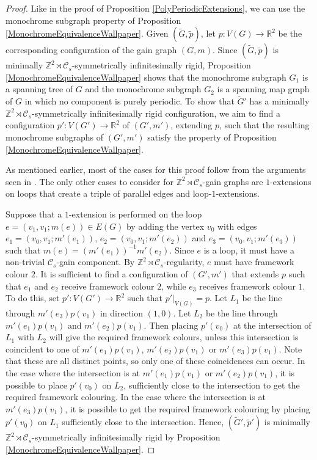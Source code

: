 \documentclass[reqno,a4paper,10pt]{article}
\theoremstyle{definition}
\theoremstyle{remark}
\numberwithin{equation}{section}
\numberwithin{figure}{section}
\numberwithin{table}{section}
\newcommand{\R}{\mathbb{R}}
\newcommand{\Z}{\mathbb{Z}}
\newcommand{\G}{\tilde{G}}
\newcommand{\p}{\tilde{p}}
\begin{document}
    \begin{proof}
        Like in the proof of Proposition \ref{PolyPeriodicExtensions}, we can use the monochrome subgraph property of Proposition \ref{MonochromeEquivalenceWallpaper}. Given $(\G,\p)$, let $p:V(G)\to\R^2$ be the corresponding configuration of the gain graph $(G,m)$. Since $(\G,\p)$ is minimally $\Z^2\rtimes\mathcal{C}_s$-symmetrically infinitesimally rigid, Proposition \ref{MonochromeEquivalenceWallpaper} shows that the monochrome subgraph $G_1$ is a spanning tree of $G$ and the monochrome subgraph $G_2$ is a spanning map graph of $G$ in which no component is purely periodic. To show that $\G'$ has a minimally $\Z^2\rtimes\mathcal{C}_s$-symmetrically infinitesimally rigid configuration, we aim to find a configuration $p':V(G')\to\R^2$ of $(G',m')$, extending $p$, such that the resulting monochrome subgraphs of $(G',m')$ satisfy the property of Proposition \ref{MonochromeEquivalenceWallpaper}.
        
        As mentioned earlier, most of the cases for this proof follow from the arguments seen in \cite[Theorem 22]{GridLike}. The only other cases to consider for $\Z^2\rtimes\mathcal{C}_s$-gain graphs are $1$-extensions on loops that create a triple of parallel edges and loop-$1$-extensions.
        
        Suppose that a $1$-extension is performed on the loop $e=(v_1,v_1;m(e))\in E(G)$ by adding the vertex $v_0$ with edges $e_1=(v_0,v_1;m'(e_1))$, $e_2=(v_0,v_1;m'(e_2))$ and $e_3=(v_0,v_1;m'(e_3))$ such that $m(e)=(m'(e_1))^{-1}m'(e_2)$. Since $e$ is a loop, it must have a non-trivial $\mathcal{C}_s$-gain component. By $\Z^2\rtimes\mathcal{C}_s$-regularity, $e$ must have framework colour $2$. It is sufficient to find a configuration of $(G',m')$ that extends $p$ such that $e_1$ and $e_2$ receive framework colour $2$, while $e_3$ receives framework colour $1$. To do this, set $p':V(G')\to\R^2$ such that $p'|_{V(G)}=p$. Let $L_1$ be the line through $m'(e_3)p(v_1)$ in direction $(1,0)$. Let $L_2$ be the line through $m'(e_1)p(v_1)$ and $m'(e_2)p(v_1)$. Then placing $p'(v_0)$ at the intersection of $L_1$ with $L_2$ will give the required framework colours, unless this intersection is coincident to one of $m'(e_1)p(v_1)$, $m'(e_2)p(v_1)$ or $m'(e_3)p(v_1)$. Note that these are all distinct points, so only one of these coincidences can occur. In the case where the intersection is at $m'(e_1)p(v_1)$ or $m'(e_2)p(v_1)$, it is possible to place $p'(v_0)$ on $L_2$, sufficiently close to the intersection to get the required framework colouring. In the case where the intersection is at $m'(e_3)p(v_1)$, it is possible to get the required framework colouring by placing $p'(v_0)$ on $L_1$ sufficiently close to the intersection. Hence, $(\G',\p')$ is minimally $\Z^2\rtimes\mathcal{C}_s$-symmetrically infinitesimally rigid by Proposition \ref{MonochromeEquivalenceWallpaper}.


\end{proof}
\end{document}
